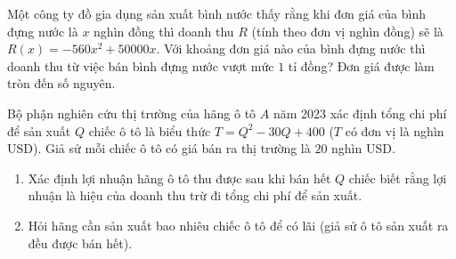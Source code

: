 \begin{bt}%
	Một công ty đồ gia dụng sản xuất bình nước thấy rằng khi đơn giá của bình đựng nước là $x$ nghìn đồng thì doanh thu $R$ (tính theo đơn vị nghìn đồng) sẽ là $R(x)=-560x^2+50000x$. Với khoảng đơn giá nào của bình đựng nước thì doanh thu từ việc bán bình đựng nước vượt mức $1$ tỉ đồng? Đơn giá được làm tròn đến số nguyên.
\end{bt}

\begin{bt}%
Bộ phận nghiên cứu thị trường của hãng ô tô $A$ năm 2023 xác định tổng chi phí để sản xuất $Q$ chiếc ô tô là biểu thức $T=Q^2-30 Q+400$ ($T$ có đơn vị là nghìn USD). Giả sử mỗi chiếc ô tô có giá bán ra thị trường là $20$ nghìn USD.
\begin{enumerate}
\item Xác định lợi nhuận hãng ô tô thu được sau khi bán hết $Q$ chiếc biết rằng lợi nhuận là hiệu của doanh thu trừ đi tổng chi phí để sản xuất.
\item Hỏi hãng cần sản xuất bao nhiêu chiếc ô tô để có lãi (giả sử ô tô sản xuất ra đều được bán hết).
\end{enumerate}
\end{bt}

